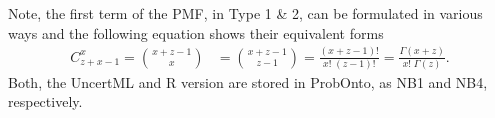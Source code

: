 Note, the first term of the PMF, in Type 1 \& 2, can be formulated in various ways 
and the following equation shows their equivalent forms
\begin{align}
C^x_{z+x-1} = {x + z -1 \choose x} &={x + z -1 \choose z - 1} = \frac{(x+z-1)!}{x!\;(z-1)!} = \frac{\Gamma(x+z)}{x! \; \Gamma(z)}. \nonumber
 \end{align} 
Both, the UncertML and R version are stored in ProbOnto, as NB1 and NB4, respectively.


















